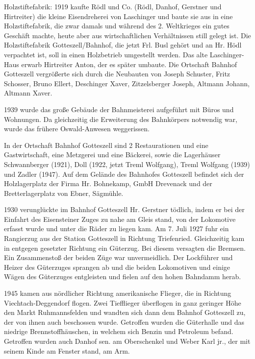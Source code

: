 Holzstiftefabrik: 1919 kaufte Rödl und Co. (Rödl, Danhof, Gerstner und
Hirtreiter) die kleine Eisendreherei von Laschinger und baute sie aus in eine
Holzstiftefabrik, die zwar damals und während des 2. Weltkrieges ein gutes
Geschäft machte, heute aber aus wirtschaftlichen Verhältnissen still gelegt ist.
Die Holzstiftefabrik Gotteszell/Bahnhof, die jetzt Frl. Busl gehört und an Hr.
Hödl verpachtet ist, soll in einen Holzbetrieb umgestellt werden. Das alte
Laschinger-Haus erwarb Hirtreiter Anton, der es später umbaute. Die Ortschaft
Bahnhof Gotteszell vergrößerte sich durch die Neubauten von Joseph Schuster,
Fritz Schosser, Bruno Ellert, Deschinger Xaver, Zitzelsberger Joseph, Altmann
Johann, Altmann Xaver.

1939 wurde das große Gebäude der Bahnmeisterei aufgeführt mit Büros und
Wohnungen. Da gleichzeitig die Erweiterung des Bahnkörpers notwendig war, wurde
das frühere Oswald-Anwesen weggerissen.

In der Ortschaft Bahnhof Gotteszell sind 2 Restaurationen und eine
Gastwirtschaft, eine Metzgerei und eine Bäckerei, sowie die Lagerhäuser
Schwannberger (1921), Doll (1922, jetzt Treml Wolfgang), Treml Wolfgang (1939)
und Zadler (1947). Auf dem Gelände des Bahnhofes Gotteszell befindet sich der
Holzlagerplatz der Firma Hr. Bohnekamp, GmbH Drevenack und der Bretterlagerplatz
von Ebner, Sägmühle.

1930 verunglückte im Bahnhof Gotteszell Hr. Gerstner tödlich, indem er bei der
Einfahrt des Eisensteiner Zuges zu nahe am Gleis stand, von der Lokomotive
erfasst wurde und unter die Räder zu liegen kam. Am 7. Juli 1927 fuhr ein
Rangierzug aus der Station Gotteszell in Richtung Triefenried. Gleichzeitig kam
in entgegen gesetzter Richtung ein Güterzug. Bei diesem versagten die Bremsen.
Ein Zusammenstoß der beiden Züge war unvermeidlich. Der Lockführer und Heizer
des Güterzuges sprangen ab und die beiden Lokomotiven und einige Wägen des
Güterzuges entgleisten und fielen auf den hohen Bahndamm herab.

1945 kamen aus nördlicher Richtung amerikanische Flieger, die in Richtung
Viechtach-Deggendorf flogen. Zwei Tiefflieger überflogen in ganz geringer Höhe
den Markt Ruhmannsfelden und wandten sich dann dem Bahnhof Gotteszell zu, der
von ihnen auch beschossen wurde. Getroffen wurden die Güterhalle und das
niedrige Brennstoffhäuschen, in welchem sich Benzin und Petroleum befand.
Getroffen wurden auch Danhof sen. am Oberschenkel und Weber Karl jr., der mit
seinem Kinde am Fenster stand, am Arm.

